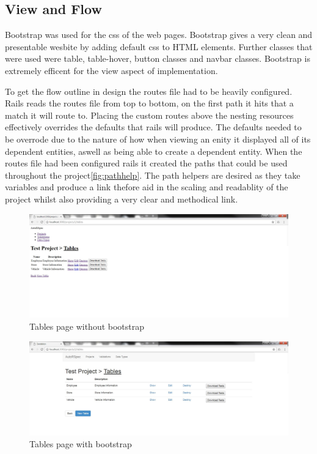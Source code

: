 \documentclass[a4paper,12pt]{article}
\begin{document}
\subsection{View and Flow}
\par Bootstrap\cite{bootstrap} was used for the css of the web pages. Bootstrap gives a very clean and presentable wesbite by adding default css to HTML elements. Further classes that were used were table, table-hover, button classes and navbar classes. Bootstrap is extremely efficent for the view aspect of implementation. 
\par To get the flow outline in design the routes file had to be heavily configured. Rails reads the routes file from top to bottom, on the first path it hits that a match it will route to. Placing the custom routes above the nesting resources effectively overrides the defaults that rails will produce. The defaults needed to be overrode due to the nature of how when viewing an enity it displayed all of its dependent entities, aswell as being able to create a dependent entity. When the routes file had been configured rails it created the paths that could be used throughout the project\ref{fig:pathhelp}. The path helpers are desired as they take variables and produce a link thefore aid in the scaling and readablity of the project whilst also providing a very clear and methodical link.\cite{routing}



\begin{figure}
\includegraphics[width=\linewidth]{screenshots/nobootstrap}
\caption{Tables page without bootstrap}
\label{fig:nobootstrap}
\end{figure}

\begin{figure}
\includegraphics[width=\linewidth]{screenshots/bootstrap}
\caption{Tables page with bootstrap}
\label{fig:bootstrap}
\end{figure}
\end{document}

